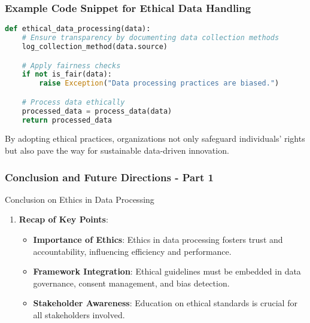 \documentclass[aspectratio=169]{beamer}
\begin{document}
\begin{frame}[fragile]
    \frametitle{Example Code Snippet for Ethical Data Handling}
    \begin{lstlisting}[language=Python]
def ethical_data_processing(data):
    # Ensure transparency by documenting data collection methods
    log_collection_method(data.source)

    # Apply fairness checks
    if not is_fair(data):
        raise Exception("Data processing practices are biased.")

    # Process data ethically
    processed_data = process_data(data)
    return processed_data
    \end{lstlisting}
    By adopting ethical practices, organizations not only safeguard individuals' rights but also pave the way for sustainable data-driven innovation.
\end{frame}

\begin{frame}[fragile]
  \frametitle{Conclusion and Future Directions - Part 1}
  
  \begin{block}{Conclusion on Ethics in Data Processing}
    \begin{enumerate}
      \item \textbf{Recap of Key Points}:
      \begin{itemize}
        \item \textbf{Importance of Ethics}: Ethics in data processing fosters trust and accountability, influencing efficiency and performance.
        \item \textbf{Framework Integration}: Ethical guidelines must be embedded in data governance, consent management, and bias detection.
        \item \textbf{Stakeholder Awareness}: Education on ethical standards is crucial for all stakeholders involved.
      \end{itemize}
    \end{enumerate}
  \end{block}
  
\end{frame}
\end{document}
